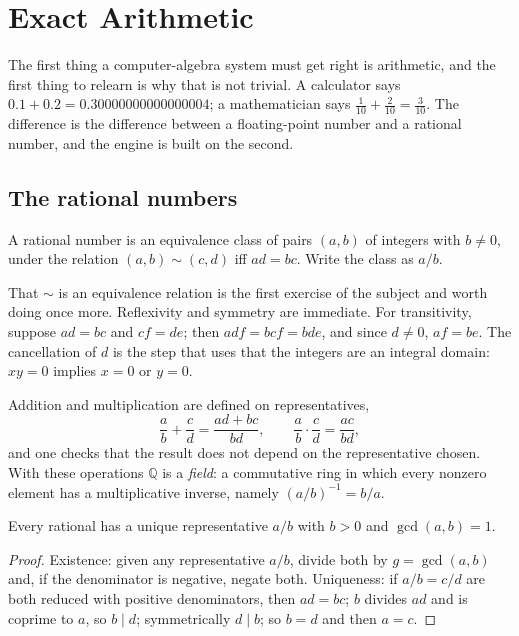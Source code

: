 \chapter{Exact Arithmetic}\label{ch:q}

The first thing a computer-algebra system must get right is arithmetic, and the first thing to
relearn is why that is not trivial. A calculator says $0.1 + 0.2 = 0.30000000000000004$; a
mathematician says $\frac{1}{10} + \frac{2}{10} = \frac{3}{10}$. The difference is the difference
between a floating-point number and a rational number, and the engine is built on the second.

\section{The rational numbers}

\begin{definition}
  A rational number is an equivalence class of pairs $(a, b)$ of integers with $b \neq 0$, under
  the relation $(a, b) \sim (c, d)$ iff $ad = bc$. Write the class as $a/b$.
\end{definition}

That $\sim$ is an equivalence relation is the first exercise of the subject and worth doing once
more. Reflexivity and symmetry are immediate. For transitivity, suppose $ad = bc$ and $cf = de$;
then $adf = bcf = bde$, and since $d \neq 0$, $af = be$. The cancellation of $d$ is the step that
uses that the integers are an integral domain: $xy = 0$ implies $x = 0$ or $y = 0$.

Addition and multiplication are defined on representatives,
\[
  \frac{a}{b} + \frac{c}{d} = \frac{ad + bc}{bd}, \qquad
  \frac{a}{b} \cdot \frac{c}{d} = \frac{ac}{bd},
\]
and one checks that the result does not depend on the representative chosen. With these
operations $\mathbb{Q}$ is a \emph{field}: a commutative ring in which every nonzero element has
a multiplicative inverse, namely $(a/b)^{-1} = b/a$.

\begin{theorem}
  Every rational has a unique representative $a/b$ with $b > 0$ and $\gcd(a, b) = 1$.
\end{theorem}
\begin{proof}
  Existence: given any representative $a/b$, divide both by $g = \gcd(a, b)$ and, if the
  denominator is negative, negate both. Uniqueness: if $a/b = c/d$ are both reduced with positive
  denominators, then $ad = bc$; $b$ divides $ad$ and is coprime to $a$, so $b \mid d$; symmetrically
  $d \mid b$; so $b = d$ and then $a = c$.
\end{proof}

